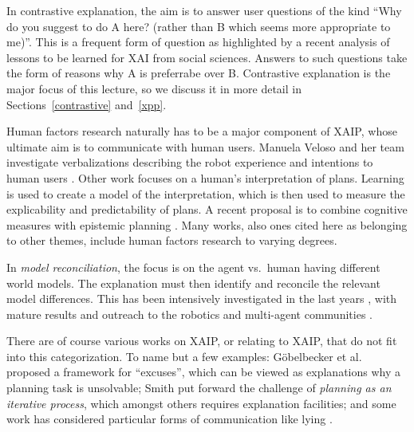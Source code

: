 In contrastive explanation, the aim is to answer user questions of the
kind ``Why do you suggest to do A here? (rather than B which seems
more appropriate to me)''. This is a frequent form of question as
highlighted by a recent analysis \cite{miller:ai-19} of lessons to be
learned for XAI from social sciences. Answers to such questions take
the form of reasons why A is preferrabe over B. Contrastive
explanation is the major focus of this lecture, so we discuss it in
more detail in Sections~\ref{contrastive} and~\ref{xpp}.

Human factors research naturally has to be a major component of XAIP,
whose ultimate aim is to communicate with human users. Manuela Veloso
and her team investigate verbalizations describing the robot
experience and intentions to human users
\cite{rosenthal:etal:ijcai-16}. Other work \cite{zhang:etal:icra-17}
focuses on a human's interpretation of plans. Learning is used to
create a model of the interpretation, which is then used to measure
the explicability and predictability of plans. A recent proposal is to
combine cognitive measures with epistemic planning
\cite{petrick:etal:xaip-19}. Many works, also ones cited here as
belonging to other themes, include human factors research to varying
degrees.

In \emph{model reconciliation}, the focus is on the agent vs.\ human
having different world models. The explanation must then identify and
reconcile the relevant model differences. This has been intensively
investigated in the last years
\cite{chakraborti:etal:ijcai-17,sreedharan:etal:icaps-18,kulkarni:etal:aamas-19,sreedharan:etal:xaip-19},
with mature results and outreach to the robotics
\cite{chakraborti:etal:hri-19} and multi-agent communities
\cite{kambhampati:aamas-19}.

There are of course various works on XAIP, or relating to XAIP, that
do not fit into this categorization. To name but a few examples:
G{\"{o}}belbecker et al.\ \cite{goebelbecker:etal:icaps-10} proposed a
framework for ``excuses'', which can be viewed as explanations why a
planning task is unsolvable; Smith \cite{smith:aaai-12} put forward
the challenge of \emph{planning as an iterative process}, which
amongst others requires explanation facilities; and some work has
considered particular forms of communication like lying
\cite{chakraborti:kambhampati:xaip-19}.









